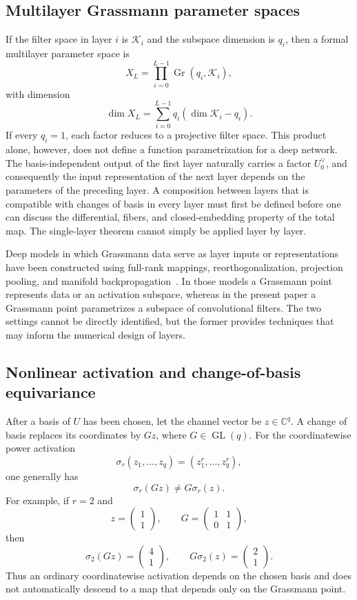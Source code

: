 \documentclass{siamonline250211}
\newcommand{\CC}{\mathbb C}
\newcommand{\Gr}{\operatorname{Gr}}
\newcommand{\GL}{\operatorname{GL}}
\newcommand{\cK}{\mathcal K}
\begin{document}
\subsection{Multilayer Grassmann parameter spaces}

If the filter space in layer $i$ is $\cK_i$ and the subspace dimension is $q_i$,
then a formal multilayer parameter space is
\[
  X_L=\prod_{i=0}^{L-1}\Gr(q_i,\cK_i),
\]
with dimension
\[
  \dim X_L
  =\sum_{i=0}^{L-1}q_i(\dim\cK_i-q_i).
\]
If every $q_i=1$, each factor reduces to a projective filter space. This product
alone, however, does not define a function parametrization for a deep network.
The basis-independent output of the first layer naturally carries a factor
$U_0^\vee$, and consequently the input representation of the next layer depends
on the parameters of the preceding layer. A composition between layers that is
compatible with changes of basis in every layer must first be defined before one
can discuss the differential, fibers, and closed-embedding property of the total
map. The single-layer theorem cannot simply be applied layer by layer.

Deep models in which Grassmann data serve as layer inputs or representations
have been constructed using full-rank mappings, reorthogonalization, projection
pooling, and manifold backpropagation~\cite{HWVG18}. In those models a Grassmann
point represents data or an activation subspace, whereas in the present paper a
Grassmann point parametrizes a subspace of convolutional filters. The two
settings cannot be directly identified, but the former provides techniques that
may inform the numerical design of layers.

\subsection{Nonlinear activation and change-of-basis equivariance}

After a basis of $U$ has been chosen, let the channel vector be $z\in\CC^q$. A
change of basis replaces its coordinates by $Gz$, where $G\in\GL(q)$. For the
coordinatewise power activation
\[
  \sigma_r(z_1,\ldots,z_q)=(z_1^r,\ldots,z_q^r),
\]
one generally has
\[
  \sigma_r(Gz)\neq G\sigma_r(z).
\]
For example, if $r=2$ and
\[
  z=\begin{pmatrix}1\\1\end{pmatrix},
  \qquad
  G=\begin{pmatrix}1&1\\0&1\end{pmatrix},
\]
then
\[
  \sigma_2(Gz)=\begin{pmatrix}4\\1\end{pmatrix},
  \qquad
  G\sigma_2(z)=\begin{pmatrix}2\\1\end{pmatrix}.
\]
Thus an ordinary coordinatewise activation depends on the chosen basis and does
not automatically descend to a map that depends only on the Grassmann point.
\end{document}
